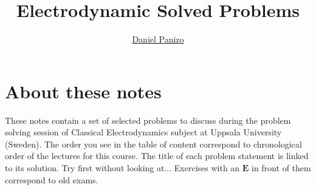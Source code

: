 \documentclass[a4paper,12pt]{article}
\begin{document}
\author{\hyperlink{daniel.panizo@physics.uu.se}{Daniel Panizo}} %
\title{Electrodynamic Solved Problems} %
\date{} %


\maketitle
\setcounter{tocdepth}{1}
\tableofcontents




\section*{About these notes}
These notes contain a set of selected problems to discuss during the problem solving session of Classical Electrodynamics subject at Uppsala University (Sweden). The order you see in the table of content correspond to chronological order of the lectures for this course. The title of each problem statement is linked to its solution. Try first without looking at...
Exercises with an $\mathbf{E}$ in front of them correspond to old exams.



\end{document}
